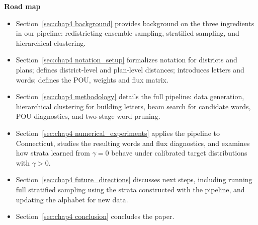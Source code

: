 \medskip
\noindent\textbf{Road map}
\begin{itemize}
    \item Section~\ref{sec:chap4 background} provides background on the three ingredients in our pipeline: redistricting ensemble sampling, stratified sampling, and hierarchical clustering.
    \item Section~\ref{sec:chap4 notation_setup} formalizes notation for districts and plans; defines district-level and plan-level distances; introduces letters and words; defines the POU, weights and flux matrix.
    \item Section~\ref{sec:chap4 methodology} details the full pipeline: data generation, hierarchical clustering for building letters, beam search for candidate words, POU diagnostics, and two-stage word pruning.
    \item Section~\ref{sec:chap4 numerical_experiments} applies the pipeline to Connecticut, studies the resulting words and flux diagnostics, and examines how strata learned from $\gamma=0$ behave under calibrated target distributions with $\gamma>0$.
    \item Section~\ref{sec:chap4 future_directions} discusses next steps, including running full stratified sampling using the strata constructed with the pipeline, and updating the alphabet for new data.
    \item Section~\ref{sec:chap4 conclusion} concludes the paper.
\end{itemize}
